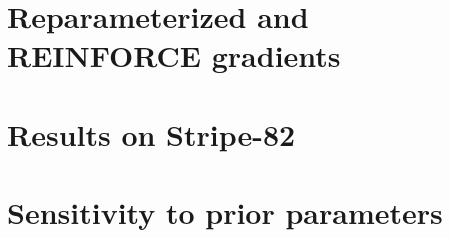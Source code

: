 \documentclass[12pt]{article}
\begin{document}
\appendix
\section{Reparameterized and REINFORCE gradients}
\label{sec:reparam_details}


\section{Results on Stripe-82}


\section{Sensitivity to prior parameters}


% 

% 
\end{document}
